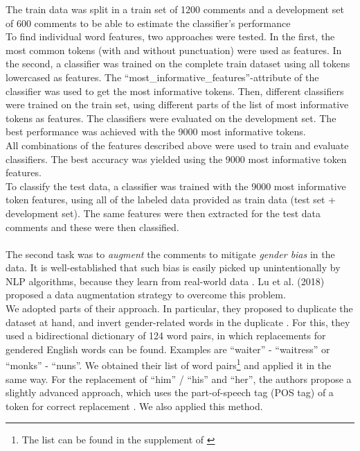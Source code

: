 \documentclass[11pt,a4paper]{article}
\begin{document}
The train data was split in a train set of 1200 comments and a development set of 600 comments to be able to estimate the classifier's performance\\
To find individual word features, two approaches were tested. In the first, the most common tokens (with and without punctuation) were used as features. In the second, a classifier was trained on the complete train dataset using all tokens lowercased as features. The ``most\_informative\_features''-attribute of the classifier was used to get the most informative tokens. Then, different classifiers were trained on the train set, using different parts of the list of most informative tokens as features. The classifiers were evaluated on the development set. The best performance was achieved with the 9000 most informative tokens.\\
All combinations of the features described above were used to train and evaluate classifiers. The best accuracy was yielded using the 9000 most informative token features. \\
To classify the test data, a classifier was trained with the 9000 most informative token features, using all of the labeled data provided as train data (test set + development set). The same features were then extracted for the test data comments and these were then classified.\\
\\
The second task was to \textit{augment} the comments to mitigate \textit{gender bias} in the data. It is well-established that such bias is easily picked up unintentionally by NLP algorithms, because they learn from real-world data \cite{Lu2018}. Lu et al. (2018) proposed a data augmentation strategy to overcome this problem. \\
We adopted parts of their approach. In particular, they proposed to duplicate the dataset at hand, and invert gender-related words in the duplicate \cite{Lu2018}. For this, they used a bidirectional dictionary of 124 word pairs, in which replacements for gendered English words can be found. Examples are ``waiter'' - ``waitress'' or ``monks'' - ``nuns''. We obtained their list of word pairs\footnote{The list can be found in the supplement of \cite{Lu2018}} and applied it in the same way. For the replacement of ``him'' / ``his'' and ``her'', the authors propose a slightly advanced approach, which uses the part-of-speech tag (POS tag) of a token for correct replacement \cite{Lu2018}. We also applied this method.\\
\end{document}
